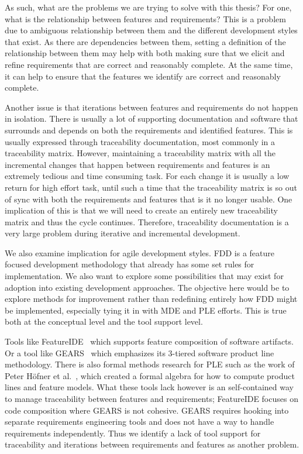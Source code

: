 As such, what are the problems we are trying to solve with this thesis? For one, what is the relationship between features and requirements? This is a problem due to ambiguous relationship between them and the different development styles that exist. As there are dependencies between them, setting a definition of the relationship between them may help with both making sure that we elicit and refine requirements that are correct and reasonably complete. At the same time, it can help to ensure that the features we identify are correct and reasonably complete.

Another issue is that iterations between features and requirements do not happen in isolation. There is usually a lot of supporting documentation and software that surrounds and depends on both the requirements and identified features. This is usually expressed through traceability documentation, most commonly in a traceability matrix. However, maintaining a traceability matrix with all the incremental changes that happen between requirements and features is an extremely tedious and time consuming task. For each change it is usually a low return for high effort task, until such a time that the traceability matrix is so out of sync with both the requirements and features that is it no longer usable. One implication of this is that we will need to create an entirely new traceability matrix and thus the cycle continues. Therefore, traceability documentation is a very large problem during iterative and incremental development.


We also examine implication for agile development styles. \ac{FDD} is a feature focused development methodology that already has some set rules for implementation. We also want to explore some possibilities that may exist for adoption into existing development approaches. The objective here would be to explore methods for improvement rather than redefining entirely how \ac{FDD} might be implemented, especially tying it in with \ac{MDE} and \ac{PLE} efforts. This is true both at the conceptual level and the tool support level.

Tools like FeatureIDE~\cite{kastner2009featureide, thum2014featureide} which supports feature composition of software artifacts. Or a tool like GEARS~\cite{GEARS} which emphasizes its 3-tiered software product line methodology. There is also formal methods research for \ac{PLE} such as the work of Peter H\"{o}fner et al.~\cite{hofner2006feature,hofner2011algebra}, which created a formal algebra for how to compute product lines and feature models. What these tools lack however is an self-contained way to manage traceability between features and requirements; FeatureIDE focuses on code composition where GEARS is not cohesive. GEARS requires hooking into separate requirements engineering tools and does not have a way to handle requirements independently. Thus we identify a lack of tool support for traceability and iterations between requirements and features as another problem.

